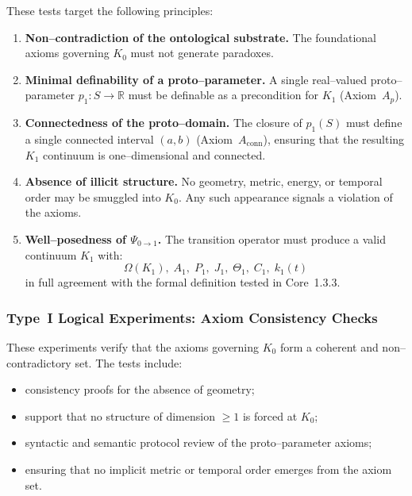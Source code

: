 These tests target the following principles:

\begin{enumerate}
    \item \textbf{Non–contradiction of the ontological substrate.}
          The foundational axioms governing $K_0$ must not generate paradoxes.

    \item \textbf{Minimal definability of a proto–parameter.}
          A single real–valued proto–parameter $p_1: S\to\mathbb{R}$ must be
          definable as a precondition for $K_1$ (Axiom~$A_p$).

    \item \textbf{Connectedness of the proto–domain.}
          The closure of $p_1(S)$ must define a single connected interval
          $(a,b)$ (Axiom~$A_{\mathrm{conn}}$), ensuring that the resulting
          $K_1$ continuum is one–dimensional and connected.

    \item \textbf{Absence of illicit structure.}
          No geometry, metric, energy, or temporal order may be smuggled into
          $K_0$.
          Any such appearance signals a violation of the axioms.

    \item \textbf{Well–posedness of $\Psi_{0\to 1}$.}
          The transition operator must produce a valid continuum $K_1$ with:
          \[
             \Omega(K_1),\; A_1,\; P_1,\; J_1,\; \Theta_1,\; C_1,\; k_1(t)
          \]
          in full agreement with the formal definition tested in
          Core~1.3.3.
\end{enumerate}


\subsubsection{Type~I Logical Experiments: Axiom Consistency Checks}

These experiments verify that the axioms governing $K_0$ form a coherent
and non–contradictory set.
The tests include:

\begin{itemize}
    \item consistency proofs for the absence of geometry;
    \item support that no structure of dimension $\ge 1$ is forced at $K_0$;
    \item syntactic and semantic protocol review of the proto–parameter axioms;
    \item ensuring that no implicit metric or temporal order emerges from
          the axiom set.
\end{itemize}

